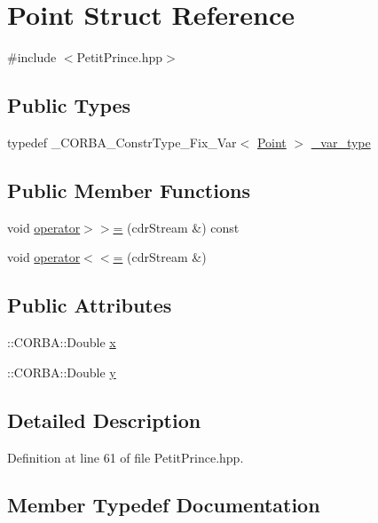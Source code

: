 \hypertarget{struct_point}{}\section{Point Struct Reference}
\label{struct_point}


{\ttfamily \#include $<$Petit\+Prince.\+hpp$>$}

\subsection*{Public Types}
\begin{DoxyCompactItemize}
\item 
typedef \+\_\+\+C\+O\+R\+B\+A\+\_\+\+Constr\+Type\+\_\+\+Fix\+\_\+\+Var$<$ \hyperlink{struct_point}{Point} $>$ \hyperlink{struct_point_ac0f868b3927103f07a654f80d55c34f0}{\+\_\+var\+\_\+type}
\end{DoxyCompactItemize}
\subsection*{Public Member Functions}
\begin{DoxyCompactItemize}
\item 
void \hyperlink{struct_point_a4e7b7000256a34f67d026218d556fadd}{operator$>$$>$=} (cdr\+Stream \&) const 
\item 
void \hyperlink{struct_point_aa1ab4ca56cba78a75f4dc163d33c3a68}{operator$<$$<$=} (cdr\+Stream \&)
\end{DoxyCompactItemize}
\subsection*{Public Attributes}
\begin{DoxyCompactItemize}
\item 
\+::C\+O\+R\+B\+A\+::\+Double \hyperlink{struct_point_a3af32dd2ea10a8184bedd984a831b295}{x}
\item 
\+::C\+O\+R\+B\+A\+::\+Double \hyperlink{struct_point_a059294d7a3980780c3e2d6c74b4197fb}{y}
\end{DoxyCompactItemize}


\subsection{Detailed Description}


Definition at line 61 of file Petit\+Prince.\+hpp.



\subsection{Member Typedef Documentation}

